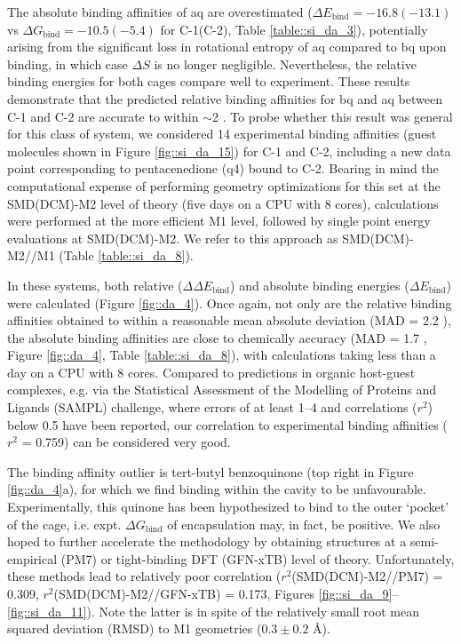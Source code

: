 \documentclass[../../main.tex]{subfiles}
\begin{document}
The absolute binding affinities of aq are overestimated ($\Delta E_\text{bind}= -16.8 (-13.1)$ vs $\Delta G_\text{bind} = -10.5 (-5.4)$ \kcalx for C-1(C-2), Table \ref{table::si_da_3}), potentially arising from the significant loss in rotational entropy of aq compared to bq upon binding, in which case $\Delta S$ is no longer negligible. Nevertheless, the relative binding energies for both cages compare well to experiment. These results demonstrate that the predicted relative binding affinities for bq and aq between C-1 and C-2 are accurate to within $\sim$2 \kcal. To probe whether this result was general for this class of system, we considered 14 experimental binding affinities (guest molecules shown in Figure \ref{fig::si_da_15}) for C-1 and C-2, including a new data point corresponding to pentacenedione (q4) bound to C-2. Bearing in mind the computational expense of performing geometry optimizations for this set at the SMD(DCM)-M2 level of theory (five days on a CPU with 8 cores), calculations were performed at the more efficient M1 level, followed by single point energy evaluations at SMD(DCM)-M2. We refer to this approach as SMD(DCM)-M2//M1 (Table \ref{table::si_da_8}).

In these systems, both relative ($\Delta\Delta E_\text{bind}$) and absolute binding energies ($\Delta E_\text{bind}$) were calculated (Figure \ref{fig::da_4}). Once again, not only are the relative binding affinities obtained to within a reasonable mean absolute deviation (MAD = 2.2 \kcal), the absolute binding affinities are close to chemically accuracy (MAD = 1.7 \kcal, Figure \ref{fig::da_4}, Table \ref{table::si_da_8}), with calculations taking less than a day on a CPU with 8 cores. Compared to predictions in organic host-guest complexes, e.g. via the Statistical Assessment of the Modelling of Proteins and Ligands (SAMPL) challenge, where errors of at least 1–4 \kcalx and correlations ($r^2$) below 0.5 have been reported, our correlation to experimental binding affinities ($r^2$ = 0.759) can be considered very good.\cite{Sure2015, Jensen2015, Rizzi2018}
 
The binding affinity outlier is tert-butyl benzoquinone (top right in Figure \ref{fig::da_4}a), for which we find binding within the cavity to be unfavourable. Experimentally, this quinone has been hypothesized to bind to the outer ‘pocket’ of the cage, i.e. expt. $\Delta G_\text{bind}$ of encapsulation may, in fact, be positive. We also hoped to further accelerate the methodology by obtaining structures at a semi-empirical (PM7\cite{Stewart2012}) or tight-binding DFT (GFN-xTB\cite{Grimme2017xtb}) level of theory. Unfortunately, these methods lead to relatively poor correlation ($r^2$(SMD(DCM)-M2//PM7) = 0.309, $r^2$(SMD(DCM)-M2//GFN-xTB) = 0.173, Figures \ref{fig::si_da_9}--\ref{fig::si_da_11}). Note the latter is in spite of the relatively small root mean squared deviation (RMSD) to M1 geometries ($0.3\pm0.2$ \AA). 
\end{document}

